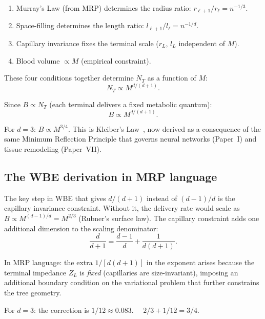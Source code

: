 \documentclass[aps,pre,twocolumn,superscriptaddress,longbibliography]{revtex4-2}
\begin{document}
\begin{enumerate}
  \item Murray's Law (from MRP) determines the radius
    ratio: $r_{\ell+1}/r_\ell = n^{-1/3}$.
  \item Space-filling determines the length ratio:
    $l_{\ell+1}/l_\ell = n^{-1/d}$.
  \item Capillary invariance fixes the terminal scale
    ($r_L$, $l_L$ independent of $M$).
  \item Blood volume $\propto M$ (empirical constraint).
\end{enumerate}

These four conditions together determine $N_T$ as a function
of $M$:
\begin{equation}
  N_T \propto M^{d/(d+1)}.
  \label{eq:NT-scaling}
\end{equation}

Since $B \propto N_T$ (each terminal delivers a fixed
metabolic quantum):
\begin{equation}
  \boxed{B \propto M^{d/(d+1)}.}
  \label{eq:kleiber}
\end{equation}

For $d = 3$: $B \propto M^{3/4}$.
This is Kleiber's Law~\cite{Kleiber1932}, now derived as a
consequence of the same Minimum Reflection Principle that
governs neural networks (Paper~I) and tissue remodeling
(Paper~VII).

\subsection{The WBE derivation in MRP language}

The key step in WBE that gives $d/(d+1)$ instead of
$(d-1)/d$ is the capillary invariance constraint.
Without it, the delivery rate would scale as
$B \propto M^{(d-1)/d} = M^{2/3}$ (Rubner's surface law).
The capillary constraint adds one additional dimension to
the scaling denominator:
\begin{equation}
  \frac{d}{d+1} = \frac{d-1}{d} + \frac{1}{d(d+1)}.
  \label{eq:exponent-decomp}
\end{equation}

In MRP language: the extra $1/[d(d+1)]$ in the exponent
arises because the terminal impedance $Z_L$ is
\emph{fixed} (capillaries are size-invariant),
imposing an additional boundary condition on the
variational problem that further constrains the tree
geometry.

For $d = 3$: the correction is $1/12 \approx 0.083$.
$\quad 2/3 + 1/12 = 3/4$.
\end{document}
